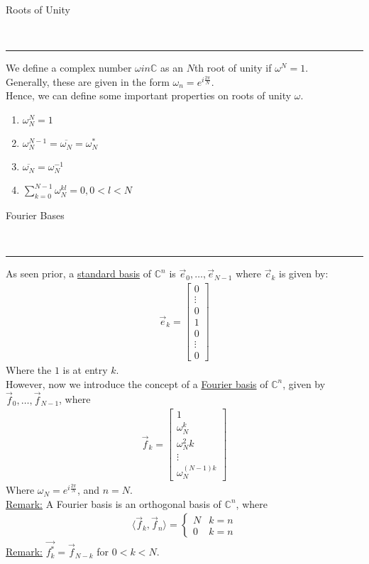 \documentclass{article}
\newcommand{\header}[1]{\begin{large}\noindent #1\end{large}\\\rule{\textwidth}{0.5pt}}
\newcommand{\gap}{\medskip\\}
\newcommand{\sheader}[1]{\underline{#1:}}
\begin{document}
\header{Roots of Unity}
We define a complex number $\omega in \mathbb{C}$ as an $N$th root of unity if $\omega^N = 1$.\\
Generally, these are given in the form $\omega_n = e^{i \frac{2\pi}{N}}$.
\gap
Hence, we can define some important properties on roots of unity $\omega$.
\begin{enumerate}
    \item $\omega_N^N = 1$
    \item $\omega_N^{N - 1} = \overline{\omega_N} = \omega_N^*$
    \item $\overline{\omega_N} = \omega_N^{-1}$
    \item $\sum_{k = 0}^{N - 1}\omega_N^{kl} = 0, 0 < l < N$
\end{enumerate}

\header{Fourier Bases}
As seen prior, a \underline{standard basis} of $\mathbb{C}^n$ is $\vec{e}_0, \ldots, \vec{e}_{N-1}$ where $\vec{c}_k$
is given by:
\begin{align*}
    \vec{e}_k = \begin{bmatrix}
        0 \\
        \vdots\\
        0\\
        1\\
        0\\
        \vdots\\
        0
    \end{bmatrix}
\end{align*}
Where the $1$ is at entry $k$.
\gap
However, now we introduce the concept of a \underline{Fourier basis} of $\mathbb{C}^n$,
given by $\vec{f}_0, \ldots, \vec{f}_{N - 1}$, where 
\begin{align*}
    \vec{f}_k = \begin{bmatrix}
        1 \\ 
        \omega_N^k\\
        \omega_N^2k\\
        \vdots \\
        \omega_N^{(N-1)k}
    \end{bmatrix}
\end{align*}
Where $\omega_N = e^{i \frac{2\pi}{N}}$, and $n = N$.\gap
\sheader{Remark} A Fourier basis is an orthogonal basis of $\mathbb{C}^n$, where 
\begin{align*}
    \langle \vec{f}_k, \vec{f}_n \rangle = \begin{cases}
        N & k = n\\
        0 & k = n
    \end{cases}
\end{align*}
\sheader{Remark} $\vec{f^*_k} = \vec{f}_{N - k}$ for $0 < k < N$.
\end{document}
